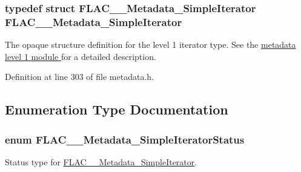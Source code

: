 \subsubsection[{\texorpdfstring{F\+L\+A\+C\+\_\+\+\_\+\+Metadata\+\_\+\+Simple\+Iterator}{FLAC__Metadata_SimpleIterator}}]{\setlength{\rightskip}{0pt plus 5cm}typedef struct {\bf F\+L\+A\+C\+\_\+\+\_\+\+Metadata\+\_\+\+Simple\+Iterator} {\bf F\+L\+A\+C\+\_\+\+\_\+\+Metadata\+\_\+\+Simple\+Iterator}}\hypertarget{group__flac__metadata__level1_ga6accccddbb867dfc2eece9ee3ffecb3a}{}\label{group__flac__metadata__level1_ga6accccddbb867dfc2eece9ee3ffecb3a}
The opaque structure definition for the level 1 iterator type. See the \hyperlink{group__flac__metadata__level1}{metadata level 1 module } for a detailed description. 

Definition at line 303 of file metadata.\+h.



\subsection{Enumeration Type Documentation}
\subsubsection[{\texorpdfstring{F\+L\+A\+C\+\_\+\+\_\+\+Metadata\+\_\+\+Simple\+Iterator\+Status}{FLAC__Metadata_SimpleIteratorStatus}}]{\setlength{\rightskip}{0pt plus 5cm}enum {\bf F\+L\+A\+C\+\_\+\+\_\+\+Metadata\+\_\+\+Simple\+Iterator\+Status}}\hypertarget{group__flac__metadata__level1_gac926e7d2773a05066115cac9048bbec9}{}\label{group__flac__metadata__level1_gac926e7d2773a05066115cac9048bbec9}
Status type for \hyperlink{struct_f_l_a_c_____metadata___simple_iterator}{F\+L\+A\+C\+\_\+\+\_\+\+Metadata\+\_\+\+Simple\+Iterator}.

